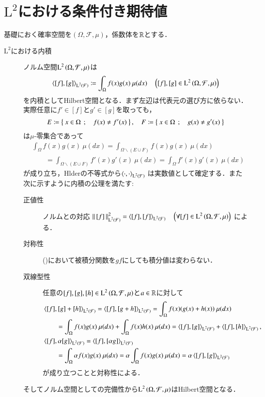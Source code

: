 \section{$\mathrm{L}^2$における条件付き期待値}
	基礎におく確率空間を$(\Omega,\mathcal{F},\mu)$，係数体を$\mathbb{R}$とする．
	
	\begin{description}
	\item[$\mathrm{L}^2$における内積]
		ノルム空間$\operatorname{L}^{2} \left(\Omega,\mathcal{F},\mu\right)$は
		\begin{align}
			\inprod<[f],[g]>_{\Lp{2}{\mathcal{F}}} \coloneqq \int_{\Omega} f(x)g(x)\ \mu(dx) \quad \left( [f],[g] \in \Lp{2}{\Omega,\mathcal{F},\mu} \right)
			\label{eq:L2_inner_product}
		\end{align}
		を内積としてHilbert空間となる．まず左辺は代表元の選び方に依らない．実際任意に$f' \in [f]$と$g' \in [g]$を取っても，
		\begin{align}
			E \coloneqq \left\{\ x \in \Omega\ \, ; \quad f(x) \neq f'(x)\ \right\}, \quad
			F \coloneqq \left\{\ x \in \Omega\ \, ; \quad g(x) \neq g'(x)\ \right\}
		\end{align}
		は$\mu$-零集合であって
		\begin{align}
			&\int_{\Omega} f(x)g(x)\ \mu(dx) = \int_{\Omega \backslash (E \cup F)} f(x)g(x)\ \mu(dx) \\
			&\qquad = \int_{\Omega \backslash (E \cup F)} f'(x)g'(x)\ \mu(dx) = \int_{\Omega} f'(x)g'(x)\ \mu(dx)
		\end{align}
		が成り立ち，Hlderの不等式から$\inprod<\cdot,\cdot>_{\Lp{2}{\mathcal{F}}}$
		は実数値として確定する．また次に示すように内積の公理を満たす:
		\begin{description}
			\item[正値性] 
				ノルムとの対応
				$\Norm{[f]}{\Lp{2}{\mathcal{F}}}^2 = \inprod<[f],[f]>_{\Lp{2}{\mathcal{F}}} \quad \left(\forall [f] \in \Lp{2}{\Omega,\mathcal{F},\mu} \right)$
				による．
			\item[対称性] 
				()において被積分関数を$gf$にしても積分値は変わらない．
			\item[双線型性] 
				任意の$[f],[g],[h] \in \operatorname{L}^{2} \left(\Omega,\mathcal{F},\mu\right)$と$a \in \mathbb{R}$に対して
				\begin{align}
					&\inprod<[f],[g] + [h]>_{\Lp{2}{\mathcal{F}}} 
					= \inprod<[f],[g + h]>_{\Lp{2}{\mathcal{F}}}
					= \int_{\Omega} f(x)(g(x) + h(x))\ \mu(dx) \\
					&\qquad= \int_{\Omega} f(x)g(x)\ \mu(dx) + \int_{\Omega} f(x)h(x)\ \mu(dx)
					= \inprod<[f],[g]>_{\Lp{2}{\mathcal{F}}} + \inprod<[f],[h]>_{\Lp{2}{\mathcal{F}}}, \\
					&\inprod<[f],\alpha [g]>_{\Lp{2}{\mathcal{F}}} 
						= \inprod<[f],[\alpha g]>_{\Lp{2}{\mathcal{F}}} \\
					&\qquad= \int_{\Omega} \alpha f(x)g(x)\ \mu(dx)
					= \alpha \int_{\Omega} f(x)g(x)\ \mu(dx)
					= \alpha \inprod<[f],[g]>_{\Lp{2}{\mathcal{F}}}
				\end{align}
				が成り立つことと対称性による．
		\end{description}
		そしてノルム空間としての完備性から$\operatorname{L}^{2} \left(\Omega,\mathcal{F},\mu\right)$はHilbert空間となる．
	

\end{description}
